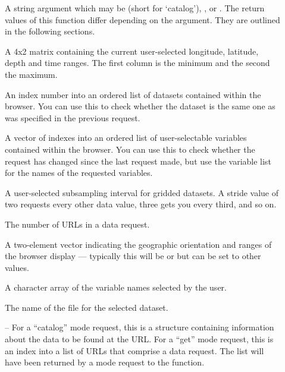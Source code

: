 \begin{description}
  
\item[] A string argument which may be  (short for
  `catalog'), , or . The return values of this
  function differ depending on the  argument.  They are
  outlined in the following sections.
  
\item[] A 4x2 matrix containing the current user-selected
  longitude, latitude, depth and time ranges. The first column is the
  minimum and the second the maximum.
  
\item[] An index number into an ordered list of datasets
  contained within the browser.  You can use this to check whether the
  dataset is the same one as was specified in the previous request.

\item[] A vector of indexes into an ordered list of
  user-selectable variables contained within the browser.  You can use
  this to check whether the request has changed since the last request
  made, but use the variable list for the names of the requested
  variables. 
  
\item[] A user-selected subsampling interval for gridded
  datasets.  A stride value of two requests every other data value,
  three gets you every third, and so on.

\item[] The number of URLs in a data request.
  
\item[] A two-element vector indicating the geographic
  orientation and ranges of the browser display --- typically this
  will be \lit{[-180 180]} or \lit{[0 360]} but can be set to other
  values.
  
\item[] A character array of the variable names
  selected by the user.
  
\item[] The name of the  file for
the selected dataset.

\item[] -- For a ``catalog'' mode request, this is a
  structure containing information about the data to be found at the
  URL.  For a ``get'' mode request, this is an index into a list of
  URLs that comprise a data request.  The list will have been returned
  by a  mode request to the  function.

\end{description}

